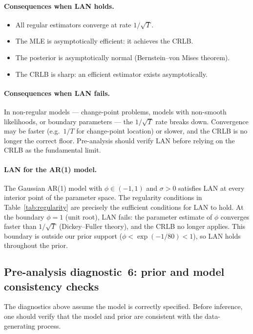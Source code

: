 \documentclass[11pt, a4paper]{article}
\begin{document}
\paragraph{Consequences when LAN holds.}
\begin{itemize}[noitemsep]
    \item All regular estimators converge at rate $1/\sqrt{T}$.
    \item The MLE is asymptotically efficient: it achieves the CRLB.
    \item The posterior is asymptotically normal (Bernstein--von Mises theorem).
    \item The CRLB is sharp: an efficient estimator exists asymptotically.
\end{itemize}

\paragraph{Consequences when LAN fails.}
In non-regular models --- change-point problems, models with non-smooth
likelihoods, or boundary parameters --- the $1/\sqrt{T}$ rate breaks down.
Convergence may be faster (e.g.\ $1/T$ for change-point location) or slower,
and the CRLB is no longer the correct floor.
Pre-analysis should verify LAN before relying on the CRLB as the fundamental
limit.

\paragraph{LAN for the AR(1) model.}
The Gaussian AR(1) model with $\phi \in (-1,1)$ and $\sigma > 0$ satisfies LAN
at every interior point of the parameter space.
The regularity conditions in Table~\ref{tab:regularity} are precisely the
sufficient conditions for LAN to hold.
At the boundary $\phi = 1$ (unit root), LAN fails: the parameter estimate of
$\phi$ converges faster than $1/\sqrt{T}$ (Dickey--Fuller theory), and the
CRLB no longer applies.
This boundary is outside our prior support ($\phi < \exp(-1/80) < 1$), so LAN
holds throughout the prior.

\subsection*{Pre-analysis diagnostic~6: prior and model consistency checks}
\label{sec:prior_checks}

The diagnostics above assume the model is correctly specified.
Before inference, one should verify that the model and prior are consistent with
the data-generating process.
\end{document}
